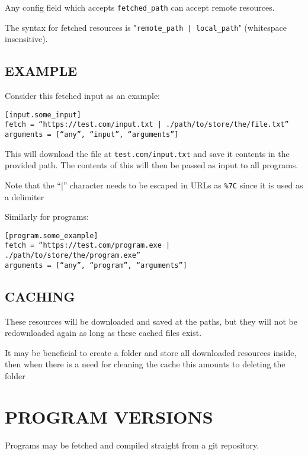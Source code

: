 \documentclass[a4paper,english]{article}
\begin{document}
\begin{adjustwidth}{18pt}{0pt}
        Any config field which accepts \texttt{fetched\_path} can accept remote resources.

        The syntax for fetched resources is "\texttt{remote\_path | local\_path}"
        (whitespace insensitive).

        \subsection{EXAMPLE}

            Consider this fetched input as an example:

            \begin{verbatim}
[input.some_input]
fetch = “https://test.com/input.txt | ./path/to/store/the/file.txt”
arguments = [“any”, “input”, “arguments”]
            \end{verbatim}
            This will download the file at \texttt{test.com/input.txt} and save it
            contents in the provided path.
            The contents of this will then be passed as input to all programs.

            Note that the “|” character needs to be escaped in URLs as
            \texttt{\%7C} since it is used as a delimiter

            Similarly for programs:

            \begin{verbatim}
[program.some_example]
fetch = “https://test.com/program.exe | ./path/to/store/the/program.exe”
arguments = [“any”, “program”, “arguments”]
            \end{verbatim}

        \subsection{CACHING}

            These resources will be downloaded and saved at the paths, but they will
            not be redownloaded again as long as these cached files exist.

            It may be beneficial to create a folder and store all downloaded resources
            inside, then when there is a need for cleaning the cache this amounts
            to deleting the folder

    \section{PROGRAM VERSIONS}

        Programs may be fetched and compiled straight from a git repository.


\end{adjustwidth}
\end{document}
